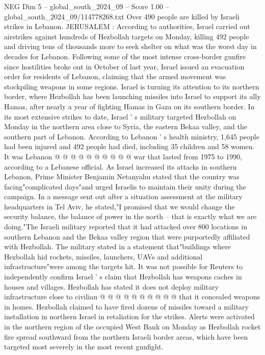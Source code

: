 \begin{textsample}{NEG Dim 5 – global\_south\_2024\_09 – Score 1.00 – global\_south\_2024\_09/114778268.txt}  \label{ex:f5_neg_200}
Over 490 people are killed by Israeli strikes in Lebanon.
JERUSALEM : According to authorities, Israel carried out airstrikes against hundreds of Hezbollah targets on Monday, killing 492 people and driving tens of thousands more to seek shelter on what was the worst day in decades for Lebanon.
Following some of the most intense cross-border gunfire since hostilities broke out in October of last year, Israel issued an evacuation order for residents of Lebanon, claiming that the armed movement was stockpiling weapons in some regions.
Israel is turning its attention to its northern border, where Hezbollah has been launching missiles into Israel to support its ally Hamas, after nearly a year of fighting Hamas in Gaza on its southern border.
In its most extensive strikes to date, Israel ' s military targeted Hezbollah on Monday in the northern area close to Syria, the eastern Bekaa valley, and the southern part of Lebanon.
According to Lebanon ' s health ministry, 1,645 people had been injured and 492 people had died, including 35 children and 58 women.
It was Lebanon @ @ @ @ @ @ @ @ @ @ war that lasted from 1975 to 1990, according to a Lebanese official.
As Israel increased its attacks in southern Lebanon, Prime Minister Benjamin Netanyahu stated that the country was facing"complicated days"and urged Israelis to maintain their unity during the campaign.
In a message sent out after a situation assessment at the military headquarters in Tel Aviv, he stated,"I promised that we would change the security balance, the balance of power in the north -- that is exactly what we are doing."The Israeli military reported that it had attacked over 800 locations in southern Lebanon and the Bekaa valley region that were purportedly affiliated with Hezbollah.
The military stated in a statement that"buildings where Hezbollah hid rockets, missiles, launchers, UAVs and additional infrastructure"were among the targets hit.
It was not possible for Reuters to independently confirm Israel ' s claim that Hezbollah has weapons caches in houses and villages.
Hezbollah has stated it does not deploy military infrastructure close to civilian @ @ @ @ @ @ @ @ @ @ that it concealed weapons in homes.
Hezbollah claimed to have fired dozens of missiles toward a military installation in northern Israel in retaliation for the strikes.
Alerts were activated in the northern region of the occupied West Bank on Monday as Hezbollah rocket fire spread southward from the northern Israeli border areas, which have been targeted most severely in the most recent gunfight.

\end{textsample}
